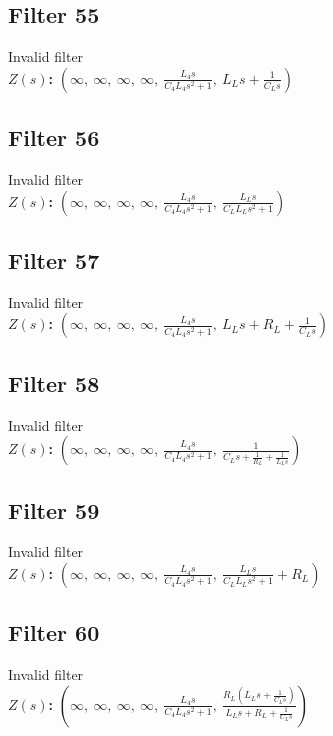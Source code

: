 \documentclass{article}
\begin{document}
\subsection*{Filter 55}
Invalid filter \\ 
\textbf{$Z(s)$:} $\left( \infty, \  \infty, \  \infty, \  \infty, \  \frac{L_{4} s}{C_{4} L_{4} s^{2} + 1}, \  L_{L} s + \frac{1}{C_{L} s}\right)$ \\ 
\subsection*{Filter 56}
Invalid filter \\ 
\textbf{$Z(s)$:} $\left( \infty, \  \infty, \  \infty, \  \infty, \  \frac{L_{4} s}{C_{4} L_{4} s^{2} + 1}, \  \frac{L_{L} s}{C_{L} L_{L} s^{2} + 1}\right)$ \\ 
\subsection*{Filter 57}
Invalid filter \\ 
\textbf{$Z(s)$:} $\left( \infty, \  \infty, \  \infty, \  \infty, \  \frac{L_{4} s}{C_{4} L_{4} s^{2} + 1}, \  L_{L} s + R_{L} + \frac{1}{C_{L} s}\right)$ \\ 
\subsection*{Filter 58}
Invalid filter \\ 
\textbf{$Z(s)$:} $\left( \infty, \  \infty, \  \infty, \  \infty, \  \frac{L_{4} s}{C_{4} L_{4} s^{2} + 1}, \  \frac{1}{C_{L} s + \frac{1}{R_{L}} + \frac{1}{L_{L} s}}\right)$ \\ 
\subsection*{Filter 59}
Invalid filter \\ 
\textbf{$Z(s)$:} $\left( \infty, \  \infty, \  \infty, \  \infty, \  \frac{L_{4} s}{C_{4} L_{4} s^{2} + 1}, \  \frac{L_{L} s}{C_{L} L_{L} s^{2} + 1} + R_{L}\right)$ \\ 
\subsection*{Filter 60}
Invalid filter \\ 
\textbf{$Z(s)$:} $\left( \infty, \  \infty, \  \infty, \  \infty, \  \frac{L_{4} s}{C_{4} L_{4} s^{2} + 1}, \  \frac{R_{L} \left(L_{L} s + \frac{1}{C_{L} s}\right)}{L_{L} s + R_{L} + \frac{1}{C_{L} s}}\right)$ \\ 
\end{document}
